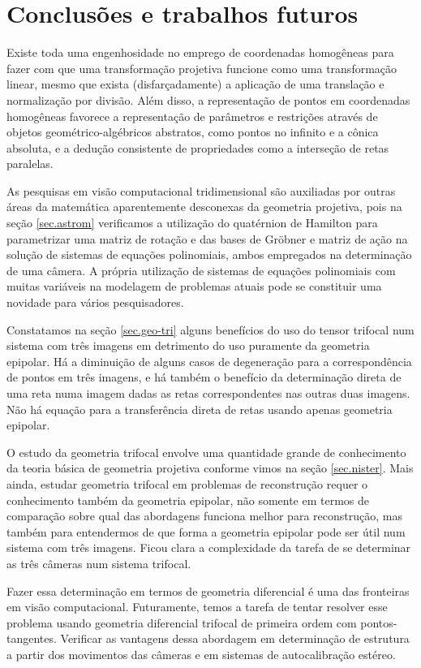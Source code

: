 \newpage
\section{Conclusões e trabalhos futuros}

Existe toda uma engenhosidade no emprego de coordenadas homogêneas para fazer com que uma transformação projetiva funcione como uma transformação linear, mesmo que exista (disfarçadamente) a aplicação de uma translação e normalização por divisão. Além disso, a representação de pontos em coordenadas homogêneas favorece a representação de parâmetros e restrições através de objetos geométrico-algébricos abstratos, como pontos no infinito e a cônica absoluta, e a dedução consistente de propriedades como a interseção de retas paralelas.

As pesquisas em visão computacional tridimensional são auxiliadas por outras áreas da matemática aparentemente desconexas da geometria projetiva, pois na seção \ref{sec.astrom} verificamos a utilização do quatérnion de Hamilton para parametrizar uma matriz de rotação e das bases de Gr\"obner e matriz de ação na solução de sistemas de equações polinomiais, ambos empregados na determinação de uma câmera. A própria utilização de sistemas de equações polinomiais com muitas variáveis na modelagem de problemas atuais pode se constituir uma novidade para vários pesquisadores.

Constatamos na seção \ref{sec.geo-tri} alguns benefícios do uso do tensor trifocal num sistema com três imagens em detrimento do uso puramente da geometria epipolar. Há a diminuição de alguns casos de degeneração para a correspondência de pontos em três imagens, e há também o benefício da determinação direta de uma reta numa imagem dadas as retas correspondentes nas outras duas imagens. Não há equação para a transferência direta de retas usando apenas geometria epipolar.

O estudo da geometria trifocal envolve uma quantidade grande de conhecimento da teoria básica de geometria projetiva conforme vimos na seção \ref{sec.nister}. Mais ainda, estudar geometria trifocal em problemas de reconstrução requer o conhecimento também da geometria epipolar, não somente em termos de comparação sobre qual das abordagens funciona melhor para reconstrução, mas também para entendermos de que forma a geometria epipolar pode ser útil num sistema com três imagens. Ficou clara a complexidade da tarefa de se determinar as três câmeras num sistema trifocal.

Fazer essa determinação em termos de geometria diferencial é uma das fronteiras em visão computacional. Futuramente, temos a tarefa de tentar resolver esse problema usando geometria diferencial trifocal de primeira ordem com pontos-tangentes. Verificar as vantagens dessa abordagem em determinação de estrutura a partir dos movimentos das câmeras e em sistemas de autocalibração estéreo.

